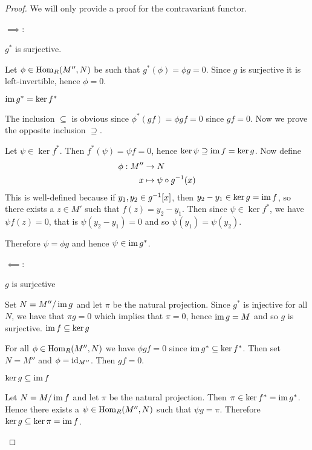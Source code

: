 \begin{proof}
	We will only provide a proof for the contravariant functor. \par
	$\implies$:
	\begin{enum}
		\io
		$g^*$ is surjective.\par
		Let $\phi \in \operatorname{Hom}_R(M'',N)$ be such that $g^*(\phi) = \phi g = 0$.
		Since $g$ is surjective it is left-invertible, hence $\phi=0$.
		
		\io
		$\operatorname{im} g^* = \ker f^*$ \par
		The inclusion $\subseteq$ is obvious since $\phi^*(gf) = \phi gf = 0$ since $gf=0$.
		Now we prove the opposite inclusion $\supseteq$.
		
		Let $\psi \in \ker f^*$.
		Then $f^*(\psi) = \psi f = 0$, hence $\ker \psi \supseteq \operatorname{im} f = \ker g$.
		Now define
		\begin{align*}
			\phi: M'' &\to N \\
			x &\mapsto \psi \circ g^{-1}(x)
		\end{align*}
		This is well-defined because if $y_1,y_2 \in g^{-1}[x]$, then $y_2-y_1 \in \ker g = \operatorname{im} f$, so there exists a $z \in M'$ such that $f(z) = y_2-y_1$.
		Then since $\psi \in \ker f^*$, we have $\psi f(z) = 0$, that is $\psi(y_2-y_1) = 0$ and so $\psi(y_1)=\psi(y_2)$.
		
		Therefore $\psi = \phi g$ and hence $\psi \in \operatorname{im} g^*$.
	\end{enum}
	
	$\impliedby$:
	\begin{enum}
		\io $g$ is surjective \par
		Set $N = M''/\operatorname{im} g$ and let $\pi$ be the natural projection.
		Since $g^*$ is injective for all $N$, we have that $\pi g = 0$ which implies that $\pi=0$, hence $\operatorname{im} g = M$ and so $g$ is surjective.
		\io $\operatorname{im} f \subseteq \ker g$ \par
		For all $\phi \in \operatorname{Hom}_R(M'',N)$ we have $\phi gf=0$ since $\operatorname{im} g^* \subseteq \ker f^*$.
		Then set $N = M''$ and $\phi = \operatorname{id}_{M''}$.
		Then $gf=0$.
		
		\io
		$\ker g \subseteq \operatorname{im} f$ \par
		Let $N = M/\operatorname{im} f$ and let $\pi$ be the natural projection.
		Then $\pi \in \ker f^* = \operatorname{im} g^*$.
		Hence there exists a $\psi \in \operatorname{Hom}_R(M'',N)$ such that $\psi g = \pi$.
		Therefore $\ker g \subseteq \ker \pi = \operatorname{im} f$. \qedhere
	\end{enum}
\end{proof}

